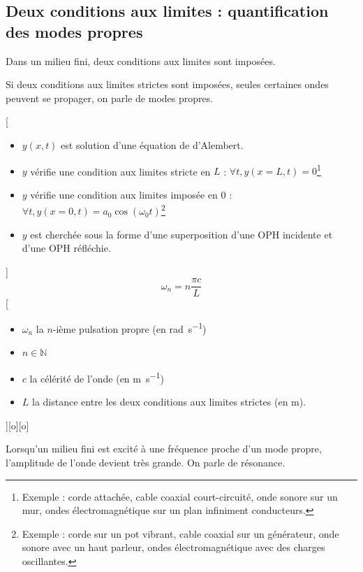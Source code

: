 \subsection{Deux conditions aux limites : quantification des modes propres}
Dans un milieu fini, deux conditions aux limites sont imposées.

Si deux conditions aux limites strictes sont imposées, seules certaines ondes peuvent se propager, on parle de modes propres.

[
    \begin{itemize}
        \item $y(x,t)$ est solution d'une équation de d'Alembert.
        \item $y$ vérifie une condition aux limites stricte en $L$ : $\forall t, y(x=L,t)=0$\footnote{Exemple : corde attachée, cable coaxial court-circuité, onde sonore sur un mur, ondes électromagnétique sur un plan infiniment conducteurs.}
        \item $y$ vérifie une condition aux limites imposée en $0$ : $\forall t, y(x=0,t)=a_0\cos(\omega_0t)$\footnote{Exemple : corde sur un pot vibrant, cable coaxial sur un générateur, onde sonore avec un haut parleur, ondes électromagnétique avec des charges oscillantes.}
        \item $y$ est cherchée sous la forme d'une superposition d'une OPH incidente et d'une OPH réfléchie.
    \end{itemize}
]
{
    $$\omega_n=n\frac{\pi c}{L}$$
}
[
    \begin{itemize}
        \item $\omega_n$ la $n$-ième pulsation propre (en \unit{rad.s^{-1}})
        \item $n\in\mathbb{N}$
        \item $c$ la célérité de l'onde (en \unit{m.s^{-1}})
        \item $L$ la distance entre les deux conditions aux limites strictes (en \unit{m}).
    \end{itemize}
][o][o]

Lorsqu'un milieu fini est excité à une fréquence proche d'un mode propre, l'amplitude de l'onde devient très grande. On parle de résonance.


